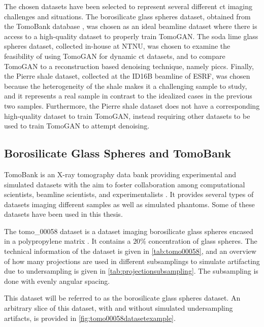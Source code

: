 The chosen datasets have been selected to represent several different \gls{ct} imaging challenges and situations. The borosilicate glass spheres dataset, obtained from the TomoBank database \cite{TomoBank}, was chosen as an ideal beamline dataset where there is access to a high-quality dataset to properly train TomoGAN. The soda lime glass spheres dataset, collected in-house at NTNU, was chosen to examine the feasibility of using TomoGAN for dynamic \gls{ct} datasets, and to compare TomoGAN to a reconstruction based denoising technique, namely \gls{piccs}. Finally, the Pierre shale dataset, collected at the ID16B beamline of ESRF, was chosen because the heterogeneity of the shale makes it a challenging sample to study, and it represents a real sample in contrast to the idealized cases in the previous two samples. Furthermore, the Pierre shale dataset does not have a corresponding high-quality dataset to train TomoGAN, instead requiring other datasets to be used to train TomoGAN to attempt denoising. 

\subsection{Borosilicate Glass Spheres and TomoBank}
\label{sec:method:datasets:tomo00058}
TomoBank is an X-ray tomography data bank providing experimental and simulated datasets with the aim to foster collaboration among computational scientists, beamline scientists, and experimentalists \cite{TomoBank}. It provides several types of datasets imaging different samples as well as simulated phantoms. Some of these datasets have been used in this thesis.

The tomo\_00058 dataset is a dataset imaging borosilicate glass spheres encased in a polypropylene matrix \cite{datasetglassspheres}. It contains a $20\%$ concentration of glass spheres. The technical information of the dataset is given in \cref{tab:tomo00058}, and an overview of how many projections are used in different subsamplings to simulate artifacting due to undersampling is given in \cref{tab:projectionsubsampling}. The subsampling is done with evenly angular spacing. 

This dataset will be referred to as the borosilicate glass spheres dataset. An arbitrary slice of this dataset, with and without simulated undersampling artifacts, is provided in \cref{fig:tomo00058datasetexample}. 

